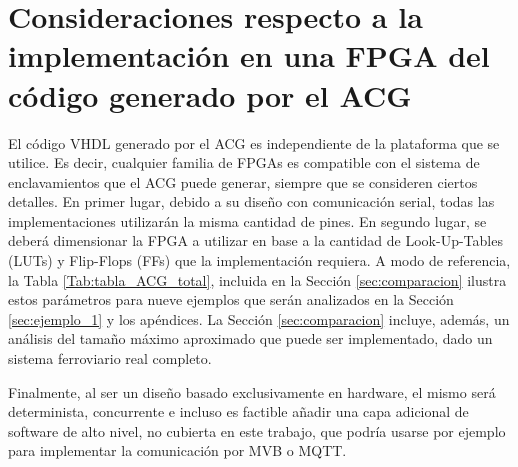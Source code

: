 \section{Consideraciones respecto a la implementación en una FPGA del código generado por el ACG}
	\label{sec:plataforma}
		
	
	El código VHDL generado por el ACG es independiente de la plataforma que se utilice. Es decir, cualquier familia de FPGAs es compatible con el sistema de enclavamientos que el ACG puede generar, siempre que se consideren ciertos detalles. En primer lugar, debido a su diseño con comunicación serial, todas las implementaciones utilizarán la misma cantidad de pines. En segundo lugar, se deberá dimensionar la FPGA a utilizar en base a la cantidad de Look-Up-Tables (LUTs) y Flip-Flops (FFs) que la implementación requiera. A modo de referencia, la Tabla \ref{Tab:tabla_ACG_total}, incluida en la Sección \ref{sec:comparacion} ilustra estos parámetros para nueve ejemplos que serán analizados en la Sección \ref{sec:ejemplo_1} y los apéndices. La Sección \ref{sec:comparacion} incluye, además, un análisis del tamaño máximo aproximado que puede ser implementado, dado un sistema ferroviario real completo.
	
	Finalmente, al ser un diseño basado exclusivamente en hardware, el mismo será determinista, concurrente e incluso es factible añadir una capa adicional de software de alto nivel, no cubierta en este trabajo, que podría usarse por ejemplo para implementar la comunicación por MVB o MQTT.
